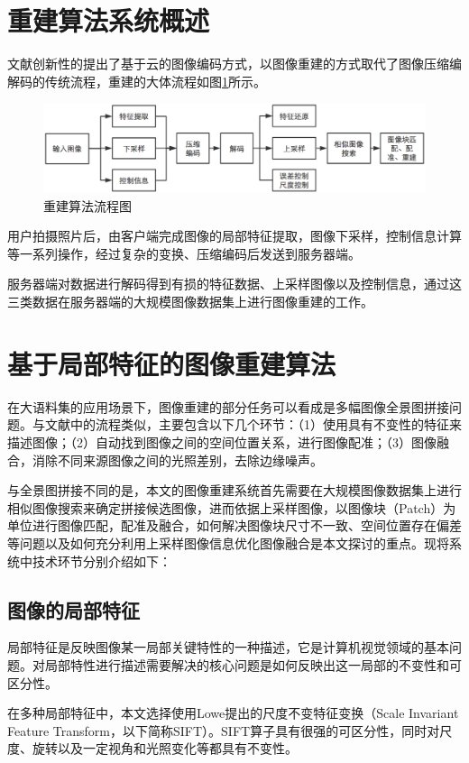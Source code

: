 \documentclass[UTF8]{csoarticle}
\begin{document}
\section{重建算法系统概述}
文献\cite{Cloud}创新性的提出了基于云的图像编码方式，以图像重建的方式取代了图像压缩编解码的传统流程，重建的大体流程如图\ref{fig:flow}所示。

\begin{figure}
\centering\includegraphics[width=15cm]{flowchart}
\caption{重建算法流程图}
\label{fig:flow}
\end{figure}

用户拍摄照片后，由客户端完成图像的局部特征提取，图像下采样，控制信息计算等一系列操作，经过复杂的变换、压缩编码后发送到服务器端。

服务器端对数据进行解码得到有损的特征数据、上采样图像以及控制信息，通过这三类数据在服务器端的大规模图像数据集上进行图像重建的工作。

\section{基于局部特征的图像重建算法}
在大语料集的应用场景下，图像重建的部分任务可以看成是多幅图像全景图拼接问题。与文献\cite{Brown:2006ir}中的流程类似，主要包含以下几个环节：（1）使用具有不变性的特征来描述图像；（2）自动找到图像之间的空间位置关系，进行图像配准；（3）图像融合，消除不同来源图像之间的光照差别，去除边缘噪声。

与全景图拼接不同的是，本文的图像重建系统首先需要在大规模图像数据集上进行相似图像搜索来确定拼接候选图像，进而依据上采样图像，以图像块（Patch）为单位进行图像匹配，配准及融合，如何解决图像块尺寸不一致、空间位置存在偏差等问题以及如何充分利用上采样图像信息优化图像融合是本文探讨的重点。现将系统中技术环节分别介绍如下：

\subsection{图像的局部特征}
局部特征是反映图像某一局部关键特性的一种描述，它是计算机视觉领域的基本问题。对局部特性进行描述需要解决的核心问题是如何反映出这一局部的不变性和可区分性。

在多种局部特征中，本文选择使用Lowe提出的尺度不变特征变换（Scale Invariant Feature Transform，以下简称SIFT）。SIFT算子具有很强的可区分性，同时对尺度、旋转以及一定视角和光照变化等都具有不变性。
\end{document}
